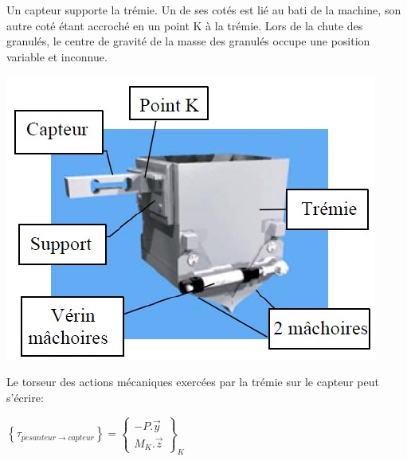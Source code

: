 \begin{minipage}{0.6\linewidth}
Un capteur supporte la trémie. Un de ses cotés est lié au bati de la machine, son autre coté étant accroché en un point K à la trémie.
Lors de la chute des granulés, le centre de gravité de la masse des granulés occupe une position variable et inconnue.
\end{minipage}
\hfill
\begin{minipage}{0.37\linewidth}
\centering\includegraphics[width=0.8\linewidth]{img/doseur4.jpg}
\end{minipage}

Le torseur des actions mécaniques exercées par la trémie sur le capteur peut s'écrire:

$\left\{\tau_{pesanteur \rightarrow capteur}\right\}=\left\{
\begin{array}{c}
-P.\overrightarrow{y} \\
M_K.\overrightarrow{z}
\end{array}\right\}_K$

